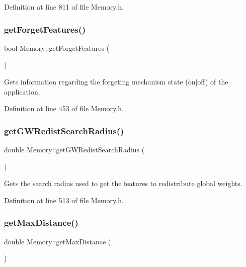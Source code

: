 Definition at line 811 of file Memory.\+h.

\mbox{\label{class_memory_a590b5d16853c7af4c97fbffab86b9c4b}} 
\subsubsection{\texorpdfstring{get\+Forget\+Features()}{getForgetFeatures()}}
{\footnotesize\ttfamily bool Memory\+::get\+Forget\+Features (\begin{DoxyParamCaption}{ }\end{DoxyParamCaption})\hspace{0.3cm}{\ttfamily [inline]}}

Gets information regarding the forgeting mechanism state (on$\vert$off) of the application. 

Definition at line 453 of file Memory.\+h.

\mbox{\label{class_memory_a46da690515148bd8adaf9fbc7f42e0dc}} 
\subsubsection{\texorpdfstring{get\+G\+W\+Redist\+Search\+Radius()}{getGWRedistSearchRadius()}}
{\footnotesize\ttfamily double Memory\+::get\+G\+W\+Redist\+Search\+Radius (\begin{DoxyParamCaption}{ }\end{DoxyParamCaption})\hspace{0.3cm}{\ttfamily [inline]}}

Gets the search radius used to get the features to redistribute global weights. 

Definition at line 513 of file Memory.\+h.

\mbox{\label{class_memory_a7cc17e0a04c535832ae23420901b3978}} 
\subsubsection{\texorpdfstring{get\+Max\+Distance()}{getMaxDistance()}}
{\footnotesize\ttfamily double Memory\+::get\+Max\+Distance (\begin{DoxyParamCaption}{ }\end{DoxyParamCaption})\hspace{0.3cm}{\ttfamily [inline]}}



